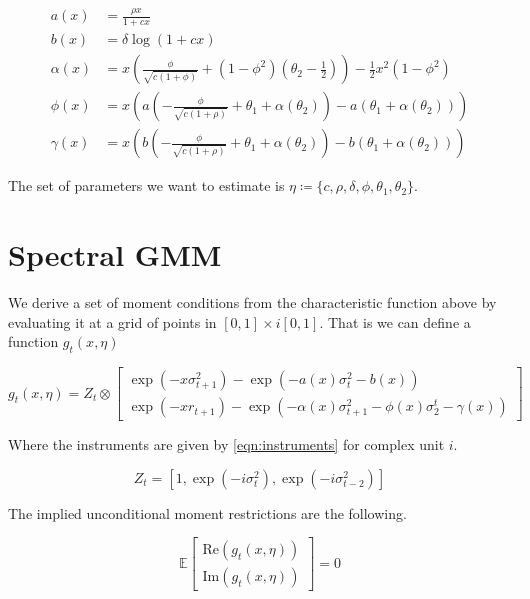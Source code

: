\documentclass[11pt]{article}
\newcommand*{\E}{\mathbb{E}}
\begin{document}
\begin{align}
    a(x) &= \frac{\rho x}{1 + c x} \\ \label{eqn:a(x)}
    b(x) &= \delta \log \left(1 + c x\right) \\ \label{eqn:b(x)}
    \alpha(x) &= x \left(\frac{\phi}{\sqrt{c (1 + \phi)}}  + (1 - \phi^2)\left(\theta_2 - \frac{1}{2}\right)\right)
    - \frac{1}{2} x^2 (1 - \phi^2) \\ \label{eqn:alpha(x)}
    \phi(x)  &= x \left(a\left(-\frac{\phi}{\sqrt{c(1+ \rho)}} + \theta_1 + \alpha(\theta_2)\right) -
        a\left(\theta_1 + \alpha(\theta_2)\right)\right) \\ \label{eqn:beta(x)}
    \gamma(x) &= x \left(b\left(-\frac{\phi}{\sqrt{c(1+\rho)}} + \theta_1 + \alpha(\theta_2)\right) -
        b\left(\theta_1 + \alpha(\theta_2)\right) \right)
\end{align}


The set of parameters we want to estimate is $\eta \coloneqq \lbrace c, \rho, \delta, \phi, \theta_1,
\theta_2\rbrace$.

\section{Spectral GMM}

We derive a set of moment conditions from the characteristic function above by evaluating it at a grid of points
in $[0,1] \times i [0,1]$. 
That is we can define a function $g_t(x, \eta)$

\begin{equation}
g_t(x, \eta) = Z_t \otimes \begin{bmatrix} \exp(- x \sigma^2_{t+1}) - \exp\left( - a(x) \sigma_t^2 - b(x)
    \right) \\ \exp\left(- x r_{t+1}\right) - \exp\left(- \alpha(x) \sigma^2_{t+1} - \phi(x) \sigma_2^t -
    \gamma(x)\right) \end{bmatrix}
\end{equation}

Where the instruments are given by \cref{eqn:instruments} for complex unit $i$. 

\begin{equation}
    \label{eqn:instruments}
    Z_t = \left[1, \exp\left(- i \sigma_t^2\right), \exp\left(-i \sigma^2_{t-2}\right)\right] 
\end{equation}

The implied unconditional moment restrictions are the following.  

\begin{equation}
    \E \begin{bmatrix}  \mathrm{Re} (g_t(x, \eta)) \\ \mathrm{Im} (g_t(x, \eta)) \end{bmatrix} = 0
\end{equation}
\end{document}

